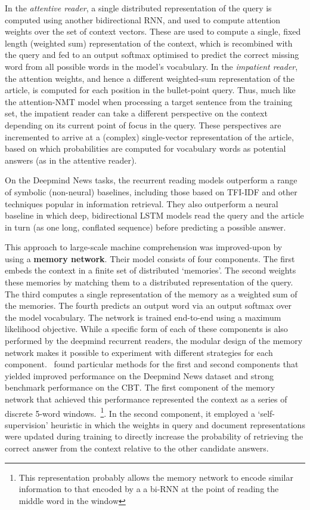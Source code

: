 \documentclass[11pt,letterpaper]{article}
\begin{document}
In the \emph{attentive reader}, a single distributed representation of the query is computed using another bidirectional RNN, and used to compute attention weights over the set of context vectors. These are used to compute a single, fixed length (weighted sum) representation of the context, which is recombined with the query and fed to an output softmax optimised to predict the correct missing word from all possible words in the model's vocabulary.  In the \emph{impatient reader}, the attention weights, and hence a different weighted-sum representation of the article, is computed for each position in the bullet-point query. Thus, much like the attention-NMT model when processing a target sentence from the training set, the impatient reader can take a different perspective on the context depending on its current point of focus in the query. These perspectives are incremented to arrive at a (complex) single-vector representation of the article, based on which probabilities are computed for vocabulary words as potential answers (as in the attentive reader).

On the Deepmind News tasks, the recurrent reading models outperform a range of symbolic (non-neural) baselines, including those based on TFI-IDF and other techniques popular in information retrieval. They also outperform a neural baseline in which deep, bidirectional LSTM models read the query and the article in turn (as one long, conflated sequence) before predicting a possible answer.

This approach to large-scale machine comprehension was improved-upon by~ using a {\bf memory network}. Their model consists of four components. The first embeds the context in a finite set of distributed `memories'. The second weights these memories by matching them to a distributed representation of the query. The third computes a single representation of the memory as a weighted sum of the memories. The fourth predicts an output word via an output softmax over the model vocabulary. The network is trained end-to-end using a maximum likelihood objective. While a specific form of each of these components is also performed by the deepmind recurrent readers, the modular design of the memory network makes it possible to experiment with different strategies for each component.~ found particular methods for the first and second components that yielded improved performance on the Deepmind News dataset and strong benchmark performance on the CBT. The first component of the memory network that achieved this performance represented the context as a series of discrete 5-word windows.~\footnote{This representation probably allows the memory network to encode similar information to that encoded by a a bi-RNN at the point of reading the middle word in the window}. In the second component, it employed a `self-supervision' heuristic in which the weights in query and document representations were updated during training to directly increase the probability of retrieving the correct answer from the context relative to the other candidate answers. 
\end{document}
